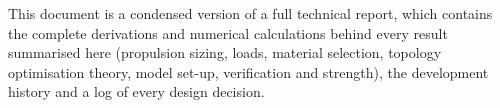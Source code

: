 This document is a condensed version of a full technical report, which contains the complete derivations and numerical calculations behind every result summarised here (propulsion sizing, loads, material selection, topology optimisation theory, model set-up, verification and strength), the development history and a log of every design decision.
